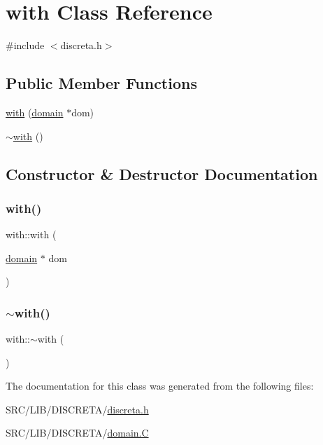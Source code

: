 \hypertarget{classwith}{}\section{with Class Reference}
\label{classwith}


{\ttfamily \#include $<$discreta.\+h$>$}

\subsection*{Public Member Functions}
\begin{DoxyCompactItemize}
\item 
\mbox{\hyperlink{classwith_a2542a5ac5af2d8c577d8b00d33adfa05}{with}} (\mbox{\hyperlink{classdomain}{domain}} $\ast$dom)
\item 
\mbox{\hyperlink{classwith_a77e07c1f4c1ecd00db6fcb2dcb18cf6b}{$\sim$with}} ()
\end{DoxyCompactItemize}


\subsection{Constructor \& Destructor Documentation}
\mbox{\label{classwith_a2542a5ac5af2d8c577d8b00d33adfa05}} 
\subsubsection{\texorpdfstring{with()}{with()}}
{\footnotesize\ttfamily with\+::with (\begin{DoxyParamCaption}\item[{\mbox{\hyperlink{classdomain}{domain}} $\ast$}]{dom }\end{DoxyParamCaption})}

\mbox{\label{classwith_a77e07c1f4c1ecd00db6fcb2dcb18cf6b}} 
\subsubsection{\texorpdfstring{$\sim$with()}{~with()}}
{\footnotesize\ttfamily with\+::$\sim$with (\begin{DoxyParamCaption}{ }\end{DoxyParamCaption})}



The documentation for this class was generated from the following files\+:\begin{DoxyCompactItemize}
\item 
S\+R\+C/\+L\+I\+B/\+D\+I\+S\+C\+R\+E\+T\+A/\mbox{\hyperlink{discreta_8h}{discreta.\+h}}\item 
S\+R\+C/\+L\+I\+B/\+D\+I\+S\+C\+R\+E\+T\+A/\mbox{\hyperlink{domain_8_c}{domain.\+C}}\end{DoxyCompactItemize}
